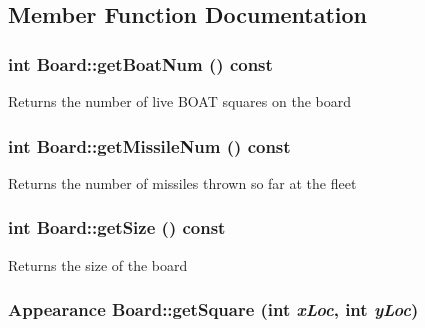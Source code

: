 \subsection{Member Function Documentation}
\hypertarget{class_board_ae2eb5e315d5c381a33cdb3bb52c42c1c}{
\subsubsection[{getBoatNum}]{\setlength{\rightskip}{0pt plus 5cm}int Board::getBoatNum () const}}
\label{class_board_ae2eb5e315d5c381a33cdb3bb52c42c1c}
\begin{DoxyReturn}{Returns}
the number of live BOAT squares on the board 
\end{DoxyReturn}
\hypertarget{class_board_a055269f475d4935abbd42a79999586b0}{
\subsubsection[{getMissileNum}]{\setlength{\rightskip}{0pt plus 5cm}int Board::getMissileNum () const}}
\label{class_board_a055269f475d4935abbd42a79999586b0}
\begin{DoxyReturn}{Returns}
the number of missiles thrown so far at the fleet 
\end{DoxyReturn}
\hypertarget{class_board_a65a9e00ec8f504699ca6226f78516a1e}{
\subsubsection[{getSize}]{\setlength{\rightskip}{0pt plus 5cm}int Board::getSize () const}}
\label{class_board_a65a9e00ec8f504699ca6226f78516a1e}
\begin{DoxyReturn}{Returns}
the size of the board 
\end{DoxyReturn}
\hypertarget{class_board_a24e413281caad849124fc21df3b3a4da}{
\subsubsection[{getSquare}]{\setlength{\rightskip}{0pt plus 5cm}Appearance Board::getSquare (int {\em xLoc}, \/  int {\em yLoc})}}
